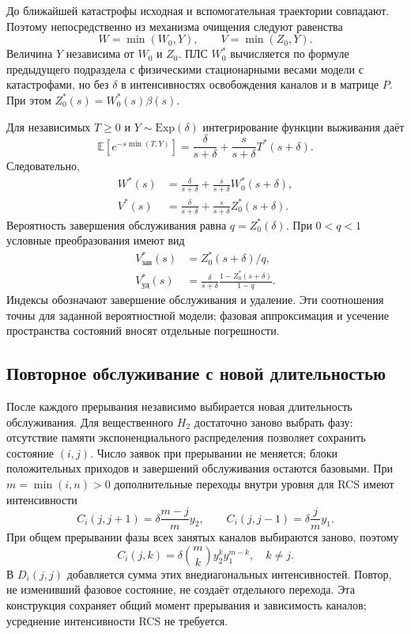 \documentclass[a4paper,12pt]{article}
\begin{document}
До ближайшей катастрофы исходная и вспомогательная траектории совпадают. Поэтому непосредственно из механизма очищения следуют равенства
\[
W=\min(W_0,Y),\qquad V=\min(Z_0,Y).
\]
Величина \(Y\) независима от \(W_0\) и \(Z_0.\) ПЛС \(W_0^*\) вычисляется по формуле предыдущего подраздела с физическими стационарными весами модели с катастрофами, но без \(\delta\) в интенсивностях освобождения каналов и в матрице \(P.\) При этом \(Z_0^*(s)=W_0^*(s)\beta(s).\)

Для независимых \(T\ge0\) и \(Y\sim\mathrm{Exp}(\delta)\) интегрирование функции выживания даёт
\[
\mathbb E[e^{-s\min(T,Y)}]=\frac{\delta}{s+\delta}+\frac{s}{s+\delta}T^*(s+\delta).
\]
Следовательно,
\begin{align*}
W^*(s)&=\frac{\delta}{s+\delta}+\frac{s}{s+\delta}W_0^*(s+\delta),\\
V^*(s)&=\frac{\delta}{s+\delta}+\frac{s}{s+\delta}Z_0^*(s+\delta).
\end{align*}
Вероятность завершения обслуживания равна \(q=Z_0^*(\delta).\) При \(0<q<1\) условные преобразования имеют вид
\begin{align*}
V_{\text{зав}}^*(s)&=Z_0^*(s+\delta)/q,\\
V_{\text{уд}}^*(s)&=\frac{\delta}{s+\delta}\frac{1-Z_0^*(s+\delta)}{1-q}.
\end{align*}
Индексы обозначают завершение обслуживания и удаление. Эти соотношения точны для заданной вероятностной модели; фазовая аппроксимация и усечение пространства состояний вносят отдельные погрешности.

\subsection{Повторное обслуживание с новой длительностью}
После каждого прерывания независимо выбирается новая длительность обслуживания. Для вещественного \(H_2\) достаточно заново выбрать фазу: отсутствие памяти экспоненциального распределения позволяет сохранить состояние \((i,j).\) Число заявок при прерывании не меняется; блоки положительных приходов и завершений обслуживания остаются базовыми. При \(m=\min(i,n)>0\) дополнительные переходы внутри уровня для RCS имеют интенсивности
\[
C_i(j,j+1)=\delta\frac{m-j}{m}y_2,\qquad
C_i(j,j-1)=\delta\frac{j}{m}y_1.
\]
При общем прерывании фазы всех занятых каналов выбираются заново, поэтому
\[
C_i(j,k)=\delta\binom{m}{k}y_2^k y_1^{m-k},\quad k\ne j.
\]
В \(D_i(j,j)\) добавляется сумма этих внедиагональных интенсивностей. Повтор, не изменивший фазовое состояние, не создаёт отдельного перехода. Эта конструкция сохраняет общий момент прерывания и зависимость каналов; усреднение интенсивности RCS не требуется.
\end{document}
